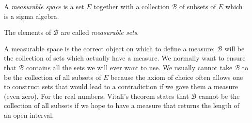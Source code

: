 \documentclass[12pt]{article}
\begin{document}
A \emph{measurable space} is a set $E$ together with a collection $\mathcal{B}$ of subsets of $E$ which is a sigma algebra.

The elements of $\mathcal{B}$ are called \emph{measurable sets}.

A measurable space is the correct object on which to define a measure; $\mathcal{B}$ will be the collection of sets which actually have a measure.  We normally want to ensure that $\mathcal{B}$ contains all the sets we will ever want to use.  We usually cannot take $\mathcal{B}$ to be the collection of all subsets of $E$ because the axiom of choice often allows one to construct sets that would lead to a contradiction if we gave them a measure (even zero).  For the real numbers, Vitali's theorem states that $\mathcal{B}$ cannot be the collection of all subsets if we hope to have a measure that returns the length of an open interval.
\end{document}
